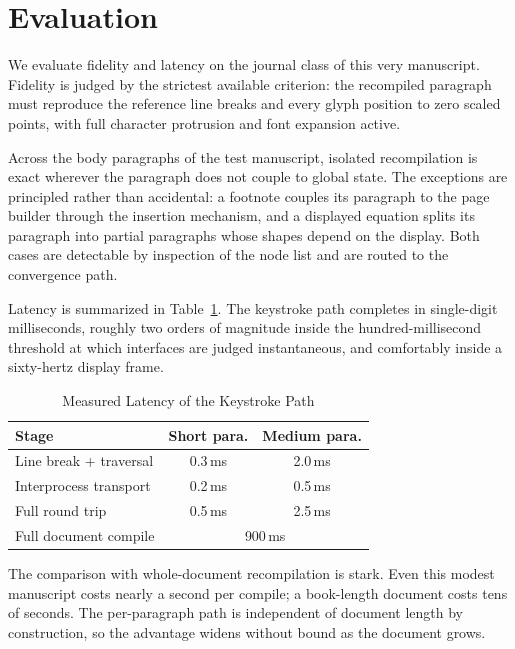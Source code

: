 \documentclass[journal]{IEEEtran}
\begin{document}
\section{Evaluation}

\tagStructPara{}We evaluate fidelity and latency on the journal class of this very
manuscript. Fidelity is judged by the strictest available criterion: the
recompiled paragraph must reproduce the reference line breaks and every
glyph position to zero scaled points, with full character protrusion and
font expansion active.\tagStructParaEnd{}%

\tagStructPara{}Across the body paragraphs of the test manuscript, isolated recompilation
is exact wherever the paragraph does not couple to global state. The
exceptions are principled rather than accidental: a footnote couples its
paragraph to the page builder through the insertion mechanism, and a
displayed equation splits its paragraph into partial paragraphs whose
shapes depend on the display. Both cases are detectable by inspection of
the node list and are routed to the convergence path.\tagStructParaEnd{}%

\tagStructPara{}Latency is summarized in Table~\ref{tab:latency}. The keystroke path
completes in single-digit milliseconds, roughly two orders of magnitude
inside the hundred-millisecond threshold at which interfaces are judged
instantaneous, and comfortably inside a sixty-hertz display frame.\tagStructParaEnd{}%

\begin{table}[!t]
\caption{Measured Latency of the Keystroke Path\label{tab:latency}}
\centering
\begin{tabular}{lcc}
\toprule
Stage & Short para. & Medium para. \\
\midrule
Line break + traversal & 0.3\,ms & 2.0\,ms \\
Interprocess transport & 0.2\,ms & 0.5\,ms \\
Full round trip & 0.5\,ms & 2.5\,ms \\
Full document compile & \multicolumn{2}{c}{900\,ms} \\
\bottomrule
\end{tabular}
\end{table}

\tagStructPara{}The comparison with whole-document recompilation is stark. Even this
modest manuscript costs nearly a second per compile; a book-length
document costs tens of seconds. The per-paragraph path is independent of
document length by construction, so the advantage widens without bound as
the document grows.\tagStructParaEnd{}%
\end{document}

